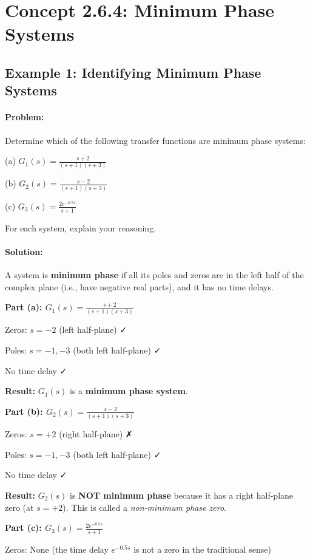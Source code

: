 \documentclass[11pt,a4paper]{article}
\begin{document}
\section{Concept 2.6.4: Minimum Phase Systems}

\subsection{Example 1: Identifying Minimum Phase Systems}

\paragraph{Problem:} Determine which of the following transfer functions are minimum phase systems:

(a) $G_1(s) = \frac{s+2}{(s+1)(s+3)}$

(b) $G_2(s) = \frac{s-2}{(s+1)(s+3)}$

(c) $G_3(s) = \frac{2e^{-0.5s}}{s+1}$

For each system, explain your reasoning.

\paragraph{Solution:}

A system is \textbf{minimum phase} if all its poles and zeros are in the left half of the complex plane (i.e., have negative real parts), and it has no time delays.

\textbf{Part (a): $G_1(s) = \frac{s+2}{(s+1)(s+3)}$}

Zeros: $s = -2$ (left half-plane) ✓

Poles: $s = -1, -3$ (both left half-plane) ✓

No time delay ✓

\textbf{Result:} $G_1(s)$ is a \textbf{minimum phase system}.

\textbf{Part (b): $G_2(s) = \frac{s-2}{(s+1)(s+3)}$}

Zeros: $s = +2$ (right half-plane) ✗

Poles: $s = -1, -3$ (both left half-plane) ✓

No time delay ✓

\textbf{Result:} $G_2(s)$ is \textbf{NOT minimum phase} because it has a right half-plane zero (at $s = +2$). This is called a \textit{non-minimum phase zero}.

\textbf{Part (c): $G_3(s) = \frac{2e^{-0.5s}}{s+1}$}

Zeros: None (the time delay $e^{-0.5s}$ is not a zero in the traditional sense)
\end{document}
